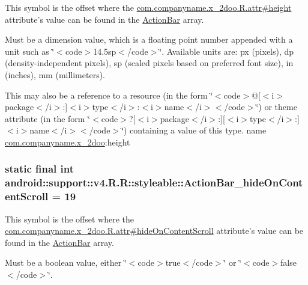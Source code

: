 This symbol is the offset where the \hyperlink{classcom_1_1companyname_1_1x__2doo_1_1_r_1_1attr_c32c88251553c82c893800333495ef41}{com.companyname.x\_\-2doo.R.attr\#height} attribute's value can be found in the \hyperlink{classandroid_1_1support_1_1v4_1_1_r_1_1styleable_5c6cf2c83551ebae05f365bb913fdddf}{ActionBar} array.

Must be a dimension value, which is a floating point number appended with a unit such as \char`\"{}$<$code$>$14.5sp$<$/code$>$\char`\"{}. Available units are: px (pixels), dp (density-independent pixels), sp (scaled pixels based on preferred font size), in (inches), mm (millimeters). 

This may also be a reference to a resource (in the form \char`\"{}$<$code$>$@\mbox{[}$<$i$>$package$<$/i$>$:\mbox{]}$<$i$>$type$<$/i$>$:$<$i$>$name$<$/i$>$$<$/code$>$\char`\"{}) or theme attribute (in the form \char`\"{}$<$code$>$?\mbox{[}$<$i$>$package$<$/i$>$:\mbox{]}\mbox{[}$<$i$>$type$<$/i$>$:\mbox{]}$<$i$>$name$<$/i$>$$<$/code$>$\char`\"{}) containing a value of this type.  name \hyperlink{namespacecom_1_1companyname_1_1x__2doo}{com.companyname.x\_\-2doo}:height \hypertarget{classandroid_1_1support_1_1v4_1_1_r_1_1styleable_d0bacf654ec88cf7bbf7f62214466f22}{
\subsubsection[{ActionBar\_\-hideOnContentScroll}]{\setlength{\rightskip}{0pt plus 5cm}static final int android::support::v4.R.R::styleable::ActionBar\_\-hideOnContentScroll = 19}}
\label{classandroid_1_1support_1_1v4_1_1_r_1_1styleable_d0bacf654ec88cf7bbf7f62214466f22}


This symbol is the offset where the \hyperlink{classcom_1_1companyname_1_1x__2doo_1_1_r_1_1attr_72dd62d92e4115df934fb0e41b37b0ac}{com.companyname.x\_\-2doo.R.attr\#hideOnContentScroll} attribute's value can be found in the \hyperlink{classandroid_1_1support_1_1v4_1_1_r_1_1styleable_5c6cf2c83551ebae05f365bb913fdddf}{ActionBar} array.

Must be a boolean value, either \char`\"{}$<$code$>$true$<$/code$>$\char`\"{} or \char`\"{}$<$code$>$false$<$/code$>$\char`\"{}. 

